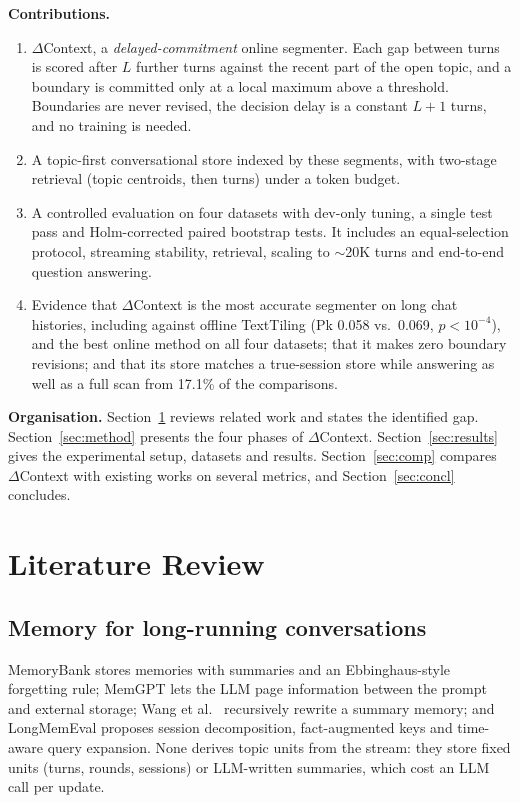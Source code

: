 \documentclass[journal]{IEEEtran}
\newcommand{\dc}{$\Delta$Context}
\begin{document}
\textbf{Contributions.}
\begin{enumerate}
\item \dc{}, a \emph{delayed-commitment} online segmenter. Each gap between
turns is scored after $L$ further turns against the recent part of the open
topic, and a boundary is committed only at a local maximum above a threshold.
Boundaries are never revised, the decision delay is a constant $L{+}1$ turns,
and no training is needed.
\item A topic-first conversational store indexed by these segments, with
two-stage retrieval (topic centroids, then turns) under a token budget.
\item A controlled evaluation on four datasets with dev-only tuning, a single
test pass and Holm-corrected paired bootstrap tests. It includes an
equal-selection protocol, streaming stability, retrieval, scaling to
$\sim$20K turns and end-to-end question answering.
\item Evidence that \dc{} is the most accurate segmenter on long chat
histories, including against offline TextTiling (Pk 0.058 vs.\ 0.069,
$p<10^{-4}$), and the best online method on all four datasets; that it makes
zero boundary revisions; and that its store matches a true-session store while
answering as well as a full scan from 17.1\% of the comparisons.
\end{enumerate}

\textbf{Organisation.} Section~\ref{sec:lit} reviews related work and states
the identified gap. Section~\ref{sec:method} presents the four phases of
\dc{}. Section~\ref{sec:results} gives the experimental setup, datasets and
results. Section~\ref{sec:comp} compares \dc{} with existing works on several
metrics, and Section~\ref{sec:concl} concludes.

\section{Literature Review}
\label{sec:lit}

\subsection{Memory for long-running conversations}
MemoryBank \cite{zhong2024memorybank} stores memories with summaries and an
Ebbinghaus-style forgetting rule; MemGPT \cite{packer2023memgpt} lets the LLM
page information between the prompt and external storage; Wang et al.\
\cite{wang2025recursive} recursively rewrite a summary memory; and LongMemEval
\cite{wu2025longmemeval} proposes session decomposition, fact-augmented keys
and time-aware query expansion. None derives topic units from the stream: they
store fixed units (turns, rounds, sessions) or LLM-written summaries, which
cost an LLM call per update.
\end{document}
